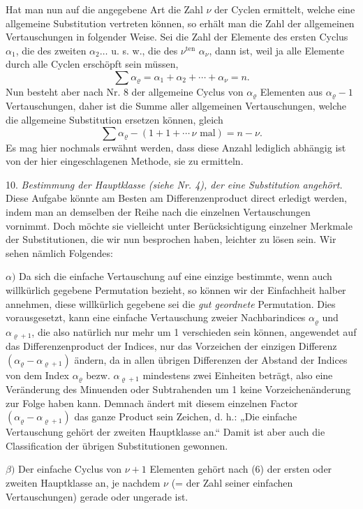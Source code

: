 \documentclass[10pt]{article}
\begin{document}
Hat man nun auf die angegebene Art die Zahl \(\nu\) der Cyclen ermittelt, welche eine allgemeine Substitution vertreten können, so erhält man die Zahl der allgemeinen Vertauschungen in folgender Weise. Sei die Zahl der Elemente des ersten Cyclus \(\alpha_1\), die des zweiten \(\alpha_2\ldots\) u. s. w., die des \(\nu^{\mathrm{ten}}\) \(\alpha_\nu\), dann ist, weil ja alle Elemente durch alle Cyclen erschöpft sein müssen,
\[
\sum\alpha_\varrho=\alpha_1+\alpha_2+\cdots+\alpha_\nu=n.
\]
Nun besteht aber nach Nr. 8 der allgemeine Cyclus von \(\alpha_\varrho\) Elementen aus \(\alpha_\varrho-1\) Vertauschungen, daher ist die Summe aller allgemeinen Vertauschungen, welche die allgemeine Substitution ersetzen können, gleich
\[
\sum\alpha_\varrho-(1+1+\cdots\,\nu\text{ mal})=n-\nu.
\]
Es mag hier nochmals erwähnt werden, dass diese Anzahl lediglich abhängig ist von der hier eingeschlagenen Methode, sie zu ermitteln.

10. \emph{Bestimmung der Hauptklasse (siehe Nr. 4), der eine Substitution angehört.} Diese Aufgabe könnte am Besten am Differenzenproduct direct erledigt werden, indem man an demselben der Reihe nach die einzelnen Vertauschungen vornimmt. Doch möchte sie vielleicht unter Berücksichtigung einzelner Merkmale der Substitutionen, die wir nun besprochen haben, leichter zu lösen sein. Wir sehen nämlich Folgendes:

\(\alpha)\) Da sich die einfache Vertauschung auf eine einzige bestimmte, wenn auch willkürlich gegebene Permutation bezieht, so können wir der Einfachheit halber annehmen, diese willkürlich gegebene sei die \emph{gut geordnete} Permutation. Dies vorausgesetzt, kann eine einfache Vertauschung zweier Nachbarindices \(\alpha_\varrho\) und \(\alpha_{\varrho+1}\), die also natürlich nur mehr um 1 verschieden sein können, angewendet auf das Differenzenproduct der Indices, nur das Vorzeichen der einzigen Differenz \((\alpha_\varrho-\alpha_{\varrho+1})\) ändern, da in allen übrigen Differenzen der Abstand der Indices von dem Index \(\alpha_\varrho\) bezw. \(\alpha_{\varrho+1}\) mindestens zwei Einheiten beträgt, also eine Veränderung des Minuenden oder Subtrahenden um 1 keine Vorzeichenänderung zur Folge haben kann. Demnach ändert mit diesem einzelnen Factor \((\alpha_\varrho-\alpha_{\varrho+1})\) das ganze Product sein Zeichen, d. h.: „Die einfache Vertauschung gehört der zweiten Hauptklasse an.“ Damit ist aber auch die Classification der übrigen Substitutionen gewonnen.

\(\beta)\) Der einfache Cyclus von \(\nu+1\) Elementen gehört nach (6) der ersten oder zweiten Hauptklasse an, je nachdem \(\nu\) (= der Zahl seiner einfachen Vertauschungen) gerade oder ungerade ist.
\end{document}
